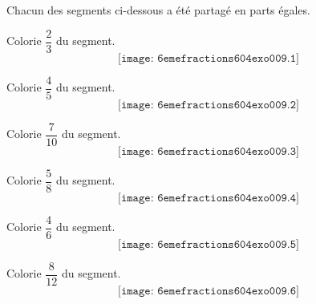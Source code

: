 Chacun des segments ci-dessous a été partagé en parts égales.
\begin{myenumerate}
\begin{multicols}{2}
\item Colorie $\dfrac23$ du segment.
\[
\texttt{[image: 6emefractions604exo009.1]}
\]
\item Colorie $\dfrac45$ du segment.
\[
\texttt{[image: 6emefractions604exo009.2]}
\]
\item Colorie $\dfrac7{10}$ du segment.
\[
\texttt{[image: 6emefractions604exo009.3]}
\]
\item Colorie $\dfrac58$ du segment.
\[
\texttt{[image: 6emefractions604exo009.4]}
\]
\item Colorie $\dfrac46$ du segment.
\[
\texttt{[image: 6emefractions604exo009.5]}
\]
\item Colorie $\dfrac8{12}$ du segment.
\[
\texttt{[image: 6emefractions604exo009.6]}
\]
\end{multicols}
\end{myenumerate}